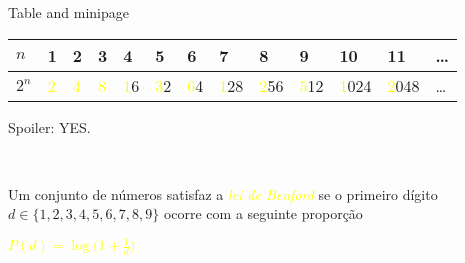     
\begin{frame}{Table and minipage}

\begin{center}
\begin{tabular}{|l|l|l|l|l|l|l|l|l|l|l|l|l|}
\hline
\(n\) & 1  & 2 & 3 & 4 & 5 & 6 & 7 & 8 & 9 & 10 & 11 & \ldots       \\ \hline
\(2^n\) & \textcolor{yellow}{2} & \textcolor{yellow}{4} & \textcolor{yellow}{8} & \textcolor{yellow}{1}6 & \textcolor{yellow}{3}2 & \textcolor{yellow}{6}4 & \textcolor{yellow}{1}28 &  \textcolor{yellow}{2}56 & \textcolor{yellow}{5}12 & \textcolor{yellow}{1}024 & \textcolor{yellow}{2}048 & \ldots    \\ \hline
\end{tabular}
\end{center}

\pause 

\bigskip

\begin{center}
\textcolor{yellow}{}
\bigskip

\pause \tiny Spoiler: \textcolor{green2}{YES}.

\end{center}


\pause 
\bigskip
\small 
\
\pause 
\begin{minipage}{0.47\textwidth}
    Um conjunto de números satisfaz a \emph{\textcolor{yellow}{lei de Benford}} se o primeiro dígito \(d \in \{1,2,3,4,5,6,7,8,9\} \) ocorre com a seguinte proporção 
\end{minipage}
\begin{minipage}{0.47\textwidth}
    \centering  \textcolor{yellow}{\(P(d) = \log\bigg(1+ \frac{1}{d}\bigg) \)} 
\end{minipage}
\end{frame}

